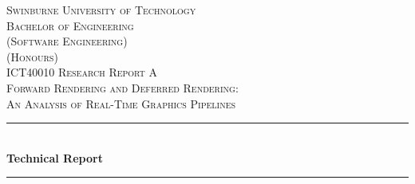 \usepackage[dvipsnames]{xcolor}

\usepackage{hyperref}
\hypersetup{
    colorlinks=true,
    allcolors=FuchsiaPink,
}

\usepackage{fontspec}
\newfontface{}
\newcommand{\emoji}[1]{{\emojifont{#1}}}





\begin{titlepage} %
  \newcommand{\HRule}{\rule{\linewidth}{0.5mm}} %

  \center{} %


  \textsc{\LARGE Swinburne University of Technology}\\[1.5cm]

  \textsc{
    \Large
    Bachelor of Engineering\\
    (Software Engineering)\\
    (Honours)
  }\\[0.5cm]

  \textsc{\large ICT40010 Research Report A}\\[0.5cm]
  \textsc{\large Forward Rendering and Deferred Rendering:\\An Analysis of Real-Time Graphics Pipelines}\\[0.5cm]


  \HRule{}\\[0.4cm]

  {\huge\bfseries Technical Report}\\[0.2cm]

  \HRule{}\\[1.5cm]


\end{titlepage}

